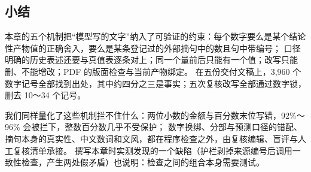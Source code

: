 \subsection{小结}
\label{sec:guards-summary}

本章的五个机制把“模型写的文字”纳入了可验证的约束：每个数字要么是某个结论性产物值的正确舍入，要么是某条登记过的外部摘句中的数且句中带编号；
口径明确的历史表述还要与真值表逐条对上；同一个量前后只能有一个值；改写只能删、不能增改；PDF 的版面检查与当前产物绑定。
在五份交付文稿上，3,960 个数字记号全部找到出处，其中约四分之三是事实；五次复核改写全部通过数字锁，删去 10～34 个记号。

我们同样量化了这些机制拦不住什么：两位小数的金额与百分数末位写错，92\%～96\% 会被拦下，整数百分数几乎不受保护；
数字换绑、分部与预测口径的错配、摘句本身的真实性、中文数词和文风，都在程序检查之外，由复核编辑、盲评与人工复核清单承接。
撰写本章时实测发现的一个缺陷（护栏剥掉来源编号后调用一致性检查，产生两处假矛盾）也说明：检查之间的组合本身需要测试。
